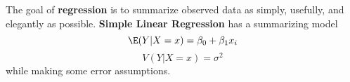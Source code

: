 \documentclass[11pt]{article}
\begin{document}
\begin{defn*}
    The goal of \textbf{regression} is to summarize observed data as simply, usefully, and elegantly as possible. \textbf{Simple Linear Regression} has a summarizing model
    \[
        \E(Y | X = x) = \beta_0 + \beta_1 x_i 
    \]
    \[
        V(Y|X = x) = \sigma^2
    \]
    while making some error assumptions. 
\end{defn*}
\end{document}
